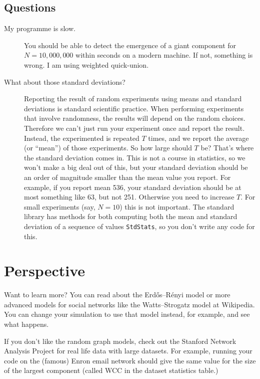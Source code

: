 \documentclass{tufte-handout}
\begin{document}
\subsection{Questions}
\begin{description}
\item[My programme is slow.] You should be able to detect the emergence
  of a giant component for $N=10,000,000$ within seconds on a modern
  machine.
  If not, something is wrong.
  I am using weighted quick-union.
\item[What about those standard deviations?]
	Reporting the result of random experiments using means and standard deviations is standard scientific practice.
  When performing experiments that involve randomness,
  the results will depend on the random choices.
  Therefore we can't just run your experiment once and report the result.
  Instead, the experimented is repeated $T$ times, and we report the average
  (or ``mean'') of those experiments.
  So how large should $T$ be?
  That's where the standard deviation comes in.
  This is not a course in statistics, so we won't make a big deal out
  of this, but your standard deviation should be an order of magnitude
  smaller than the mean value you report.
  For example, if you report mean 536, your standard deviation should
  be at most something like 63, but not 251.
  Otherwise you need to increase $T$.
  For small experiments (say, $N=10$) this is not important.
  The standard library has methods for both computing both the mean and standard
  deviation of a sequence of values {\tt StdStats}, so you don't write any code for this.
\end{description}

\section{Perspective}

Want to learn more?
You can read about the Erd\H{o}s--R\'enyi model or more advanced models for social networks like the Watts--Strogatz model at Wikipedia.
You can change your simulation to use that model instead, for example, and see what happens.

If you don't like the random graph models, check out the Stanford Network Analysis Project for real life data with large datasets.
For example, running your code on the (famous) Enron email network should give the same value for the size of the largest component (called WCC in the dataset statistics table.)
\end{document}
